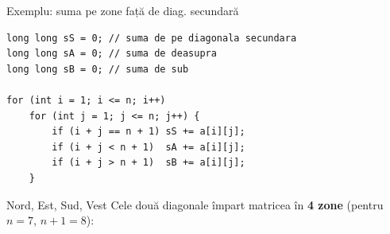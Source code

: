 \documentclass{beamer}
\begin{document}
\begin{frame}[fragile]{Exemplu: suma pe zone față de diag. secundară}
  \begin{lstlisting}
long long sS = 0; // suma de pe diagonala secundara
long long sA = 0; // suma de deasupra
long long sB = 0; // suma de sub

for (int i = 1; i <= n; i++)
    for (int j = 1; j <= n; j++) {
        if (i + j == n + 1) sS += a[i][j];
        if (i + j < n + 1)  sA += a[i][j];
        if (i + j > n + 1)  sB += a[i][j];
    }
  \end{lstlisting}
\end{frame}


\begin{frame}{Nord, Est, Sud, Vest}
  Cele două diagonale împart matricea în \textbf{4 zone} (pentru $n = 7$, $n+1 = 8$):


\end{frame}
\end{document}
